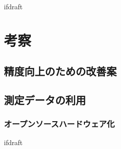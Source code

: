 \expandafter\ifx\csname ifdraft\endcsname\relax
 
\fi

\section{考察}

\subsection{精度向上のための改善案}

\subsection{測定データの利用}

\subsubsection{オープンソースハードウェア化}

\expandafter\ifx\csname ifdraft\endcsname\relax
  
\fi

